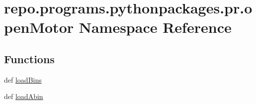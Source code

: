 \hypertarget{namespacerepo_1_1programs_1_1pythonpackages_1_1pr_1_1openMotor}{\section{repo.\-programs.\-pythonpackages.\-pr.\-open\-Motor Namespace Reference}
\label{namespacerepo_1_1programs_1_1pythonpackages_1_1pr_1_1openMotor}
}
\subsection*{Functions}
\begin{DoxyCompactItemize}
\item 
def \hyperlink{namespacerepo_1_1programs_1_1pythonpackages_1_1pr_1_1openMotor_a67f554beaac0864d301fab58bf86397b}{load\-Bins}
\item 
def \hyperlink{namespacerepo_1_1programs_1_1pythonpackages_1_1pr_1_1openMotor_a04420d495757844bca7113b696a2cb1d}{load\-Abin}
\end{DoxyCompactItemize}
